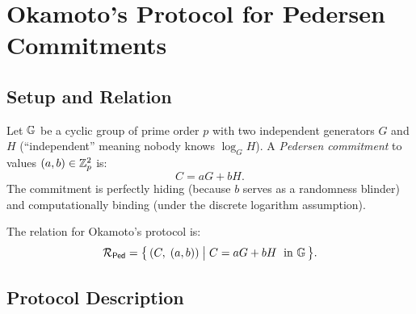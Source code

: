 \documentclass[11pt]{article}
\begin{document}
\section{Okamoto's Protocol for Pedersen Commitments}

\subsection{Setup and Relation}

Let $\mathbb{G}$ be a cyclic group of prime order $p$ with two independent generators $G$ and $H$ (``independent'' meaning nobody knows $\log_G H$). A \emph{Pedersen commitment} to values $(a, b) \in \mathbb{Z}_p^2$ is:
\[
  C = aG + bH.
\]
The commitment is perfectly hiding (because $b$ serves as a randomness blinder) and computationally binding (under the discrete logarithm assumption).

The relation for Okamoto's protocol is:
\[
  \mathcal{R}_{\mathsf{Ped}} = \bigl\{\,(C,\; (a,b)) \;\big|\; C = aG + bH\;\text{ in }\mathbb{G}\,\bigr\}.
\]

\subsection{Protocol Description}
\end{document}
